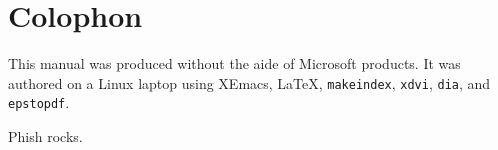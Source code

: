 \chapter{Colophon}

This manual was produced without the aide of Microsoft products.
It was authored on a Linux laptop using XEmacs, \LaTeX{},
\texttt{makeindex}, \texttt{xdvi}, \texttt{dia}, and \texttt{epstopdf}.

\rule{0pt}{17em}

\begin{flushright}
Phish rocks.
\end{flushright}
